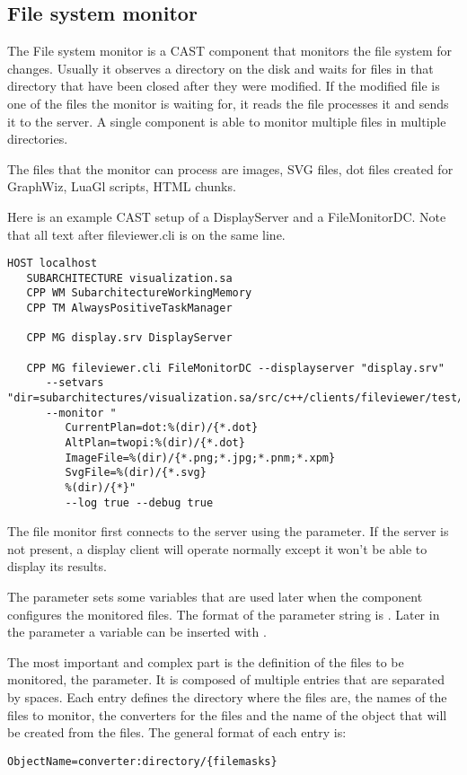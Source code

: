 \subsection{File system monitor}

The File system monitor is a CAST component that monitors the file system for
changes. Usually it observes a directory on the disk and waits for files in that
directory that have been closed after they were modified. If the modified file
is one of the files the monitor is waiting for, it reads the file processes it
and sends it to the server. A single component is able to monitor multiple files
in multiple directories.

The files that the monitor can process are images, SVG files, dot files created
for GraphWiz, LuaGl scripts, HTML chunks.

Here is an example CAST setup of a DisplayServer and a FileMonitorDC. Note that
all text after fileviewer.cli is on the same line.

\begin{Verbatim}[fontsize=\scriptsize,gobble=3]
   HOST localhost
   SUBARCHITECTURE visualization.sa 
   CPP WM SubarchitectureWorkingMemory
   CPP TM AlwaysPositiveTaskManager

   CPP MG display.srv DisplayServer

   CPP MG fileviewer.cli FileMonitorDC --displayserver "display.srv"
      --setvars "dir=subarchitectures/visualization.sa/src/c++/clients/fileviewer/test/xdata"
      --monitor "
         CurrentPlan=dot:%(dir)/{*.dot}
         AltPlan=twopi:%(dir)/{*.dot}
         ImageFile=%(dir)/{*.png;*.jpg;*.pnm;*.xpm}
         SvgFile=%(dir)/{*.svg}
         %(dir)/{*}"
         --log true --debug true
\end{Verbatim}

The file monitor first connects to the server using the 
parameter. If the server is not present, a display client will operate normally
except it won't be able to display its results.

The parameter  sets some variables that are used later when
the component configures the monitored files. The format of the parameter
string is . Later in the parameter
 a variable can be inserted with .

The most important and complex part is the definition of the files to be
monitored, the  parameter. It is composed of multiple entries
that are separated by spaces. Each entry defines the directory where the files
are, the names of the files to monitor, the converters for the files and the
name of the object that will be created from the files. The general format of
each entry is:
\begin{Verbatim}[fontsize=\scriptsize,gobble=3]
   ObjectName=converter:directory/{filemasks}
\end{Verbatim}

